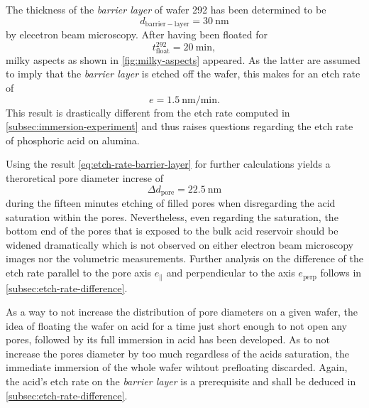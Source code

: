 \documentclass[../thesis.tex]{subfiles}
\begin{document}
            The thickness of the \textit{barrier layer} of wafer 292 has been determined to be
            \begin{equation}
              d_\mathrm{barrier-layer}=\SI{30}{\nano\meter}
            \end{equation}
            by elecetron beam microscopy. After having been floated for
            \begin{equation}
              t_\mathrm{float}^\mathrm{292}=\SI{20}{\minute},
            \end{equation}
            milky aspects as shown in \cref{fig:milky-aspects} appeared. As the latter are assumed to imply that the \textit{barrier layer} is etched off the wafer, this makes for an etch rate of
            \begin{equation}
              e=\SI{1,5}{\nano\meter\per\minute}.
              \label{eq:etch-rate-barrier-layer}
            \end{equation}
            This result is drastically different from the etch rate computed in \cref{subsec:immersion-experiment} and thus raises questions regarding the etch rate of phosphoric acid on alumina.

            Using the result \cref{eq:etch-rate-barrier-layer} for further calculations yields a theroretical pore diameter increse of
            \begin{equation}
              \Delta d_\mathrm{pore}=\SI{22,5}{\nano\meter}
            \end{equation}
            during the fifteen minutes etching of filled pores when disregarding the acid saturation within the pores. Nevertheless, even regarding the saturation, the bottom end of the pores that is exposed to the bulk acid reservoir should be widened dramatically which is not observed on either electron beam microscopy images nor the volumetric measurements. Further analysis on the difference of the etch rate parallel to the pore axis $e_\mathrm{\parallel}$ and perpendicular to the axis $e_\mathrm{perp}$ follows in \cref{subsec:etch-rate-difference}.

            As a way to not increase the distribution of pore diameters on a given wafer, the idea of floating the wafer on acid for a time just short enough to not open any pores, followed by its full immersion in acid has been developed. As to not increase the pores diameter by too much regardless of the acids saturation, the immediate immersion of the whole wafer wihtout prefloating discarded. Again, the acid's etch rate on the \textit{barrier layer} is a prerequisite and shall be deduced in \cref{subsec:etch-rate-difference}.
\end{document}
